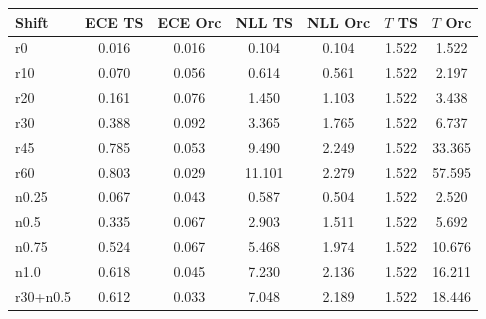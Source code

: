 \begin{tabular}{lcccccc}
\toprule
Shift & ECE TS & ECE Orc & NLL TS & NLL Orc & $T$ TS & $T$ Orc \\
\midrule
r0 & 0.016 & 0.016 & 0.104 & 0.104 & 1.522 & 1.522 \\
r10 & 0.070 & 0.056 & 0.614 & 0.561 & 1.522 & 2.197 \\
r20 & 0.161 & 0.076 & 1.450 & 1.103 & 1.522 & 3.438 \\
r30 & 0.388 & 0.092 & 3.365 & 1.765 & 1.522 & 6.737 \\
r45 & 0.785 & 0.053 & 9.490 & 2.249 & 1.522 & 33.365 \\
r60 & 0.803 & 0.029 & 11.101 & 2.279 & 1.522 & 57.595 \\
n0.25 & 0.067 & 0.043 & 0.587 & 0.504 & 1.522 & 2.520 \\
n0.5 & 0.335 & 0.067 & 2.903 & 1.511 & 1.522 & 5.692 \\
n0.75 & 0.524 & 0.067 & 5.468 & 1.974 & 1.522 & 10.676 \\
n1.0 & 0.618 & 0.045 & 7.230 & 2.136 & 1.522 & 16.211 \\
r30+n0.5 & 0.612 & 0.033 & 7.048 & 2.189 & 1.522 & 18.446 \\
\bottomrule
\end{tabular}